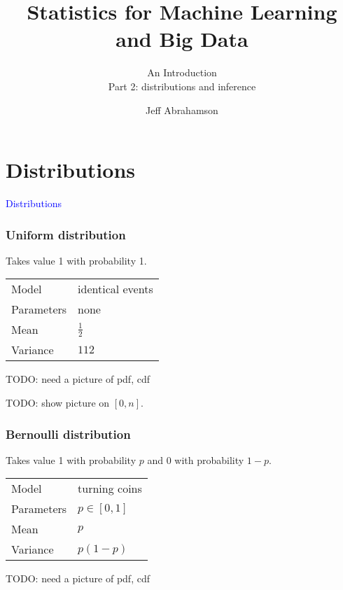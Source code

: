 \documentclass[t]{beamer}
\title
{Statistics for Machine Learning and Big Data}
\subtitle{An Introduction\\[6mm] Part 2: distributions and inference}
\author[Abrahamson] {Jeff Abrahamson}
\newcommand\blue[1]{\textcolor{blue}{#1}}
\newcommand\talksection[1]{\section{#1}
\begin{frame}
  \vfill\Huge\bf\blue{\centerline{#1}}
\end{frame}
}
\begin{document}
\begin{frame}
  \titlepage
\end{frame}

\talksection{Distributions}

\begin{frame}
  \frametitle{Uniform distribution}

  Takes value 1 with probability 1.
  \bigskip
  
  \begin{tabular}{ll}
    Model & identical events\\[1mm]
    Parameters & none\\[1mm]
    Mean & $\frac 12$\\[1mm]
    Variance & $1{12}$
  \end{tabular}

  TODO: need a picture of pdf, cdf
  
  
  TODO: show picture on $[0,n]$.

\end{frame}
\begin{frame}
  \frametitle{Bernoulli distribution}

  Takes value 1 with probability $p$ and 0 with probability $1-p$.
  \bigskip
  
  \begin{tabular}{ll}
    Model & turning coins\\[1mm]
    Parameters & $p\in [0,1]$\\[1mm]
    Mean & $p$\\[1mm]
    Variance & $p(1-p)$
  \end{tabular}

  TODO: need a picture of pdf, cdf
  
  \note{

  }
  
\end{frame}
\end{document}
